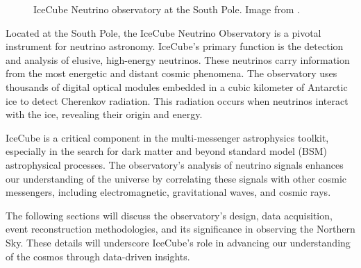 \begin{figure}[h!]
    \caption{IceCube Neutrino observatory at the South Pole. Image from .}
    \label{fig:IC3_atPole}
\end{figure}

Located at the South Pole, the IceCube Neutrino Observatory is a pivotal instrument for neutrino astronomy.
IceCube's primary function is the detection and analysis of elusive, high-energy neutrinos.
These neutrinos carry information from the most energetic and distant cosmic phenomena.
The observatory uses thousands of digital optical modules embedded in a cubic kilometer of Antarctic ice to detect Cherenkov radiation.
This radiation occurs when neutrinos interact with the ice, revealing their origin and energy.

IceCube is a critical component in the multi-messenger astrophysics toolkit, especially in the search for dark matter and beyond standard model (BSM) astrophysical processes.
The observatory's analysis of neutrino signals enhances our understanding of the universe by correlating these signals with other cosmic messengers, including electromagnetic, gravitational waves, and cosmic rays.

The following sections will discuss the observatory's design, data acquisition, event reconstruction methodologies, and its significance in observing the Northern Sky.
These details will underscore IceCube's role in advancing our understanding of the cosmos through data-driven insights.

